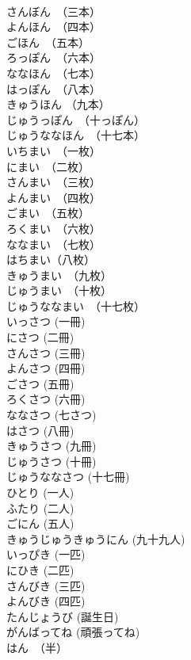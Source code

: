 \documentclass[8pt]{extreport}
\begin{document}
\begin{CJK}{UTF8}{min}
\\	さんぼん　（三本）	
\\	よんほん　（四本）	
\\	ごほん　（五本）	
\\	ろっぽん　（六本）	
\\	ななほん　（七本）	
\\	はっぽん　（八本）	
\\	きゅうほん （九本）	
\\	じゅうっぽん　（十っぽん）	
\\	じゅうななほん　（十七本）	
\\	いちまい　（一枚）	
\\	にまい　（二枚）	
\\	さんまい　（三枚）	
\\	よんまい　（四枚）	
\\	ごまい　（五枚）	
\\	ろくまい　（六枚）	
\\	ななまい　（七枚）	
\\	はちまい（八枚）	
\\	きゅうまい　（九枚）	
\\	じゅうまい　（十枚）	
\\	じゅうななまい　（十七枚）	
\\	いっさつ (一冊)	
\\	にさつ (二冊)	
\\	さんさつ (三冊)	
\\	よんさつ (四冊)	
\\	ごさつ (五冊)	
\\	ろくさつ (六冊)	
\\	ななさつ (七さつ)	
\\	はさつ (八冊)	
\\	きゅうさつ (九冊)	
\\	じゅうさつ (十冊)	
\\	じゅうななさつ (十七冊)	
\\	ひとり (一人)	
\\	ふたり (二人)	
\\	ごにん (五人)	
\\	きゅうじゅうきゅうにん (九十九人)	
\\	いっぴき (一匹)	
\\	にひき (二匹)	
\\	さんびき (三匹)	
\\	よんびき (四匹)	
\\	たんじょうび (誕生日)	
\\	がんばってね (頑張ってね)	
\\	はん　（半）	

\end{CJK}
\end{document}
